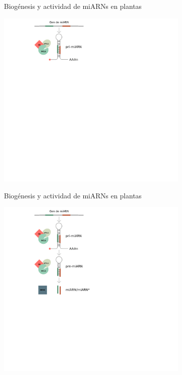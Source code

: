 \documentclass{beamer}
\begin{document}
\begin{frame}{Biogénesis y actividad de miARNs en plantas}
	\begin{center}
		\includegraphics[width=0.7\textwidth]{img/biogenesis_accion_defensa01.png}
	\end{center}
\end{frame}

\begin{frame}{Biogénesis y actividad de miARNs en plantas}
	\begin{center}
		\includegraphics[width=0.7\textwidth]{img/biogenesis_accion_defensa02.png}
	\end{center}
\end{frame}
\end{document}
